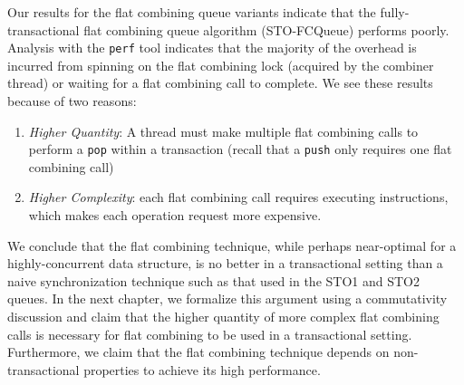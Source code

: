 Our results for the flat combining queue variants indicate that the fully-transactional flat combining queue algorithm (STO-FCQueue) performs poorly. Analysis with the \texttt{perf} tool indicates that the majority of the overhead is incurred from spinning on the flat combining lock (acquired by the combiner thread) or waiting for a flat combining call to complete. We see these results because of two reasons:
\begin{enumerate}
\item \emph{Higher Quantity}: A thread must make multiple flat combining calls to perform a \texttt{pop} within a transaction (recall that a \texttt{push} only requires one flat combining call) 
\item \emph{Higher Complexity}: each flat combining call requires executing instructions, which makes each operation request more expensive.
\end{enumerate}

We conclude that the flat combining technique, while perhaps near-optimal for a highly-concurrent data structure, is no better in a transactional setting than a naive synchronization technique such as that used in the STO1 and STO2 queues. In the next chapter, we formalize this argument using a commutativity discussion and claim that the higher quantity of more complex flat combining calls is necessary for flat combining to be used in a transactional setting. Furthermore, we claim that the flat combining technique depends on non-transactional properties to achieve its high performance. 
